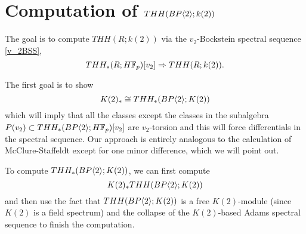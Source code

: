 
\section{Computation of $THH(BP\langle 2 \rangle;k(2))$}

The goal is to compute $THH(R;k(2))$ via the $v_2$-Bockstein spectral sequence \eqref{v_2BSS},
\[ THH_*(R;H\mathbb{F}_p)[v_2]\Rightarrow THH(R;k(2)).\]

The first goal is to show
\begin{equation}\label{K(2) coeff} K(2)_*\cong THH_*(BP\langle 2 \rangle;K(2)) \end{equation}
which will imply that all the classes except the classes in the subalgebra $P(v_2)\subset THH_*(BP\langle 2 \rangle;H\mathbb{F}_p)[v_2]$ are $v_2$-torsion and this will force differentials in the spectral sequence. Our approach is entirely analogous to the calculation of McClure-Staffeldt except for one minor difference, which we will point out. 

To compute $THH_*(BP\langle 2 \rangle;K(2))$, we can first compute 
\[ K(2)_*THH(BP\langle 2 \rangle;K(2)) \]
and then use the fact that $THH(BP\langle 2 \rangle;K(2))$ is a free $K(2)$-module (since $K(2)$ is a field spectrum) and the collapse of the $K(2)$-based Adams spectral sequence to finish the computation. 

